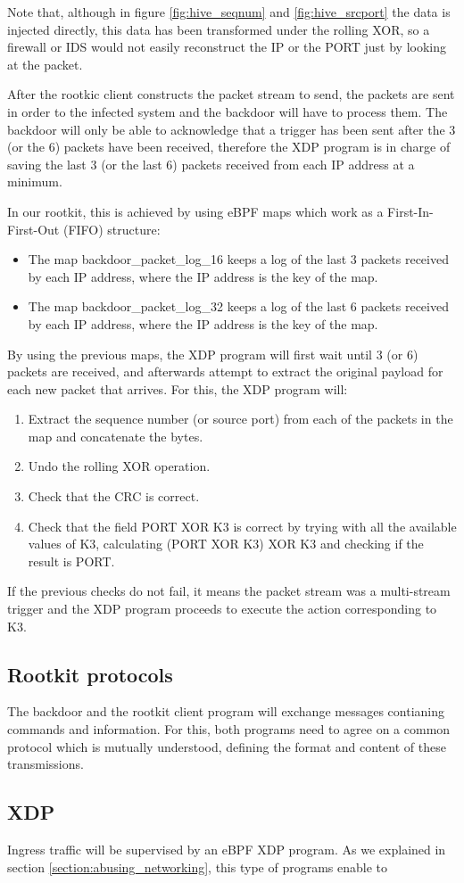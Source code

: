 Note that, although in figure \ref{fig:hive_seqnum} and \ref{fig:hive_srcport} the data is injected directly, this data has been transformed under the rolling XOR, so a firewall or IDS would not easily reconstruct the IP or the PORT just by looking at the packet.

After the rootkic client constructs the packet stream to send, the packets are sent in order to the infected system and the backdoor will have to process them. The backdoor will only be able to acknowledge that a trigger has been sent after the 3 (or the 6) packets have been received, therefore the XDP program is in charge of saving the last 3 (or the last 6) packets received from each IP address at a minimum.

In our rootkit, this is achieved by using eBPF maps which work as a First-In-First-Out (FIFO) structure:
\begin{itemize}
\item The map backdoor\_packet\_log\_16 keeps a log of the last 3 packets received by each IP address, where the IP address is the key of the map.
\item The map backdoor\_packet\_log\_32 keeps a log of the last 6 packets received by each IP address, where the IP address is the key of the map.
\end{itemize}

By using the previous maps, the XDP program will first wait until 3 (or 6) packets are received, and afterwards attempt to extract the original payload for each new packet that arrives. For this, the XDP program will:
\begin{enumerate}
\item Extract the sequence number (or source port) from each of the packets in the map and concatenate the bytes.
\item Undo the rolling XOR operation.
\item Check that the CRC is correct.
\item Check that the field PORT XOR K3 is correct by trying with all the available values of K3, calculating (PORT XOR K3) XOR K3 and checking if the result is PORT.
\end{enumerate}

If the previous checks do not fail, it means the packet stream was a multi-stream trigger and the XDP program proceeds to execute the action corresponding to K3.


\subsection{Rootkit protocols}
The backdoor and the rootkit client program will exchange messages contianing commands and information. For this, both programs need to agree on a common protocol which is mutually understood, defining the format and content of these transmissions.



\subsection{XDP}
Ingress traffic will be supervised by an eBPF XDP program. As we explained in section \ref{section:abusing_networking}, this type of programs enable to 











